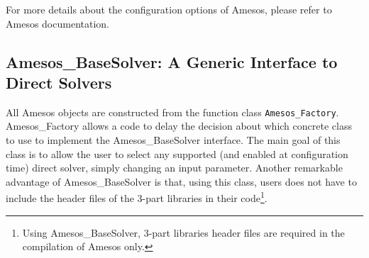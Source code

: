 For more details about the configuration options of Amesos, please refer
to Amesos documentation.





\subsection{Amesos\_BaseSolver: A Generic Interface to Direct Solvers}
\label{sec:amesos_generic}

All Amesos objects are constructed from the function class
\verb!Amesos_Factory!.  Amesos\_Factory allows a code to delay the
decision about which concrete class to use to implement the
Amesos\_BaseSolver interface. The main goal of this class is to allow
the user to select any supported (and enabled at configuration time)
direct solver, simply changing an input parameter. Another remarkable
advantage of Amesos\_BaseSolver is that, using this class, users does
not have to include the header files of the 3-part libraries in their
code\footnote{Using Amesos\_BaseSolver, 3-part libraries header files
  are required in the compilation of Amesos only.}.

